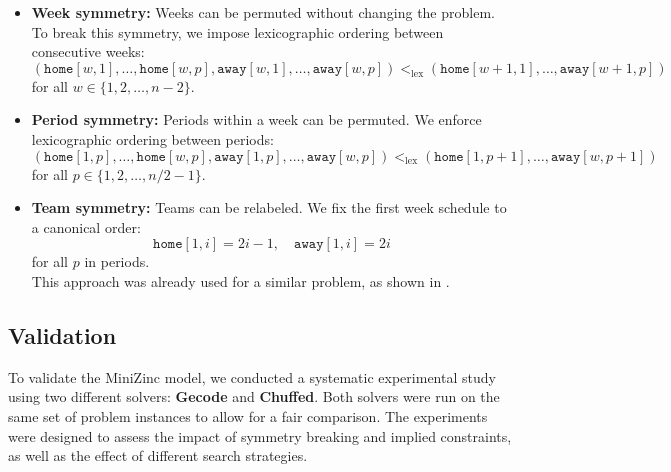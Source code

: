 \documentclass[11pt]{article}
\begin{document}
\begin{itemize}
    \item \textbf{Week symmetry:}  
    Weeks can be permuted without changing the problem. To break this symmetry, we impose lexicographic ordering between consecutive weeks:
    \begin{equation*}
        (\texttt{home}[w,1], \ldots, \texttt{home}[w,p], \texttt{away}[w,1], \ldots, \texttt{away}[w,p]) <_{\text{lex}} (\texttt{home}[w+1,1], \ldots, \texttt{away}[w+1,p])
    \end{equation*}
    for all $w \in \{1, 2, \ldots, n-2\}$.

    \item \textbf{Period symmetry:}  
    Periods within a week can be permuted. We enforce lexicographic ordering between periods:
    \begin{equation*}
        (\texttt{home}[1,p], \ldots, \texttt{home}[w,p], \texttt{away}[1,p], \ldots, \texttt{away}[w,p]) <_{\text{lex}} (\texttt{home}[1,p+1], \ldots, \texttt{away}[w,p+1])
    \end{equation*}
    for all $p \in \{1, 2, \ldots, n/2-1\}$.

    \item \textbf{Team symmetry:}  
    Teams can be relabeled. We fix the first week schedule to a canonical order:
    \begin{equation*}
        \texttt{home}[1, i] = 2i - 1,\quad \texttt{away}[1, i] = 2i
    \end{equation*}
    for all $p$ in periods.
    \\
    This approach was already used for a similar problem, as shown in \cite{teamsymm}.
\end{itemize}

\subsection{Validation}

To validate the MiniZinc model, we conducted a systematic experimental study using two different solvers: \textbf{Gecode} and \textbf{Chuffed}. Both solvers were run on the same set of problem instances to allow for a fair comparison. The experiments were designed to assess the impact of symmetry breaking and implied constraints, as well as the effect of different search strategies.
\end{document}
